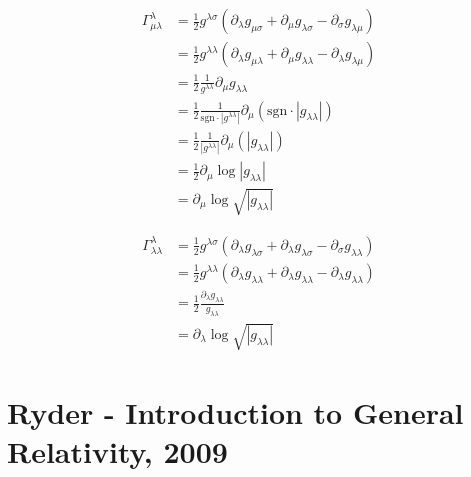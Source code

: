 \documentclass[10pt,a4paper]{book}
\theoremstyle{definition}
\begin{document}
\begin{align}
\Gamma^\lambda_{\mu\lambda}
&=\frac{1}{2}g^{\lambda\sigma}(\partial_\lambda g_{\mu\sigma}+\partial_\mu g_{\lambda\sigma}-\partial_\sigma g_{\lambda\mu})\\
&=\frac{1}{2}g^{\lambda\lambda}(\partial_\lambda g_{\mu\lambda}+\partial_\mu g_{\lambda\lambda}-\partial_\lambda g_{\lambda\mu})\\
&=\frac{1}{2}\frac{1}{g^{\lambda\lambda}}\partial_\mu g_{\lambda\lambda}\\
&=\frac{1}{2}\frac{1}{\text{sgn}\cdot|g^{\lambda\lambda}|}\partial_\mu (\text{sgn}\cdot|g_{\lambda\lambda}|)\\
&=\frac{1}{2}\frac{1}{|g^{\lambda\lambda}|}\partial_\mu (|g_{\lambda\lambda}|)\\
&=\frac{1}{2}\partial_\mu \log|g_{\lambda\lambda}|\\
&=\partial_\mu \log\sqrt{|g_{\lambda\lambda}|}
\end{align}

\begin{align}
\Gamma^\lambda_{\lambda\lambda}
&=\frac{1}{2}g^{\lambda\sigma}(\partial_\lambda g_{\lambda\sigma}+\partial_\lambda g_{\lambda\sigma}-\partial_\sigma g_{\lambda\lambda})\\
&=\frac{1}{2}g^{\lambda\lambda}(\partial_\lambda g_{\lambda\lambda}+\partial_\lambda g_{\lambda\lambda}-\partial_\lambda g_{\lambda\lambda})\\
&=\frac{1}{2}\frac{\partial_\lambda g_{\lambda\lambda}}{g_{\lambda\lambda}}\\
&=\partial_\lambda \log \sqrt{|g_{\lambda\lambda}|}
\end{align}

\section{{\sc Ryder} - Introduction to General Relativity, 2009}
\end{document}
